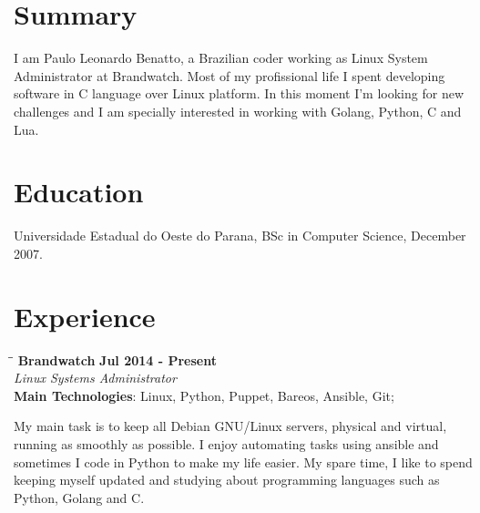 \documentclass[margin]{res}
\begin{document}
  

\address{Brighton, UK \\ benatto@gmail.com \\ Phone: +44 07424600850 \\ Post Code: BN21HF }
                           
                        
\begin{resume}
 
\section{Summary}      I am Paulo Leonardo Benatto, a Brazilian coder working as Linux 
System Administrator at Brandwatch. Most of my profissional life I spent developing software
in C language over Linux platform. In this moment I'm looking for new challenges and I am
specially interested in working with Golang, Python, C and Lua. 
 
\section{Education}	Universidade Estadual do Oeste do Parana, BSc in Computer Science, December 2007.
  
\section{Experience}

\vspace{-0.1in}
   \begin{tabbing}
   \hspace{2.3in}\= \hspace{1.7in}\= \kill %
    \textbf{Brandwatch}    \>\>\textbf{Jul 2014 - Present}\\
    \textit{Linux Systems Administrator}\\        
    \textbf{Main Technologies}: Linux, Python, Puppet, Bareos, Ansible, Git;
   \end{tabbing}\vspace{-20pt}      %
    \vspace{2mm}
My main task is to keep all Debian GNU/Linux servers, physical and virtual, running as smoothly as possible.
I enjoy automating tasks using ansible and sometimes I code in Python to make my life easier.
My spare time, I like to spend keeping myself updated and studying about programming languages such as Python, Golang and C.


\end{resume}
\end{document}
